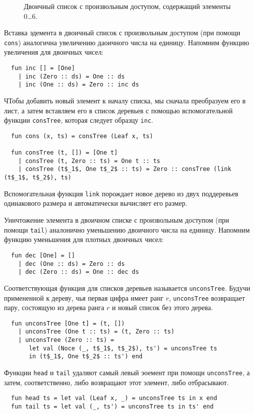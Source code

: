 \begin{figure}
  \centering
  
  \caption{Двоичный список с произвольным доступом, содержащий элементы 0\ldots 6.}
  \label{fig:9.5}
\end{figure}

Вставка эдемента в двоичный список с произвольным доступом (при помощи
\lstinline!cons!) аналогична увеличению даоичного числа на
единицу. Напомним функцию увеличения для двоичных чисел:
\begin{lstlisting}
  fun inc [] = [One]
    | inc (Zero :: ds) = One :: ds
    | inc (One :: ds) = Zero :: inc ds
\end{lstlisting}
ЧТобы добавить новый элемент к началу списка, мы сначала преобразуем
его в лист, а затем вставляем его в список деревьев с помощью
вспомогательной функции \lstinline!consTree!, которая следует образцу
\lstinline!inc!.
\begin{lstlisting}
  fun cons (x, ts) = consTree (Leaf x, ts)

  fun consTree (t, []) = [One t]
    | consTree (t, Zero :: ts) = One t :: ts
    | consTree (t$_1$, One t$_2$ :: ts) = Zero :: consTree (link (t$_1$, t$_2$), ts)
\end{lstlisting}
Вспомогательная функция \lstinline!link! порождает новое дерево из двух
поддеревьев одинакового размера и автоматически вычисляет его размер.

Уничтожение элемента в двоичном списке с произвольным доступом (при
помощи \lstinline!tail!) аналонично уменьшению двоичного числа на
единицу. Напомним функцию уменьшения для плотных двоичных чисел:
\begin{lstlisting}
  fun dec [One] = []
    | dec (One :: ds) = Zero :: ds
    | dec (Zero :: ds) = One :: dec ds
\end{lstlisting}
Соответствующая функция для списков деревьев называется
\lstinline!unconsTree!. Будучи примененной к дереву, чья первая цифра
имеет ранг $r$, \lstinline!unconsTree! возвращает пару, состоящую из
дерева ранга $r$ и новый список без этого дерева.
\begin{lstlisting}
  fun unconsTree [One t] = (t, [])
    | unconsTree (One t :: ts) = (t, Zero :: ts)
    | unconsTree (Zero :: ts) = 
       let val (Noce (_, t$_1$, t$_2$), ts') = unconsTree ts
       in (t$_1$, One t$_2$ :: ts') end
\end{lstlisting}
Функции \lstinline!head! и \lstinline!tail!  удаляют самый левый
эоемент при помощи \lstinline!unconsTree!, а затем, соответственно,
либо возвращают этот элемент, либо отбрасывают.
\begin{lstlisting}
  fun head ts = let val (Leaf x, _) = unconsTree ts in x end
  fun tail ts = let val (_, ts') = unconsTree ts in ts' end
\end{lstlisting}

